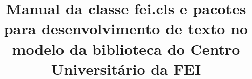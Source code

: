 \documentclass{fei}
\begin{document}
\author{}
\title{Manual da classe fei.cls e pacotes para desenvolvimento de texto no modelo da biblioteca do Centro Universitário da FEI}

\sumario{}





\bibliografia{}
\end{document}
